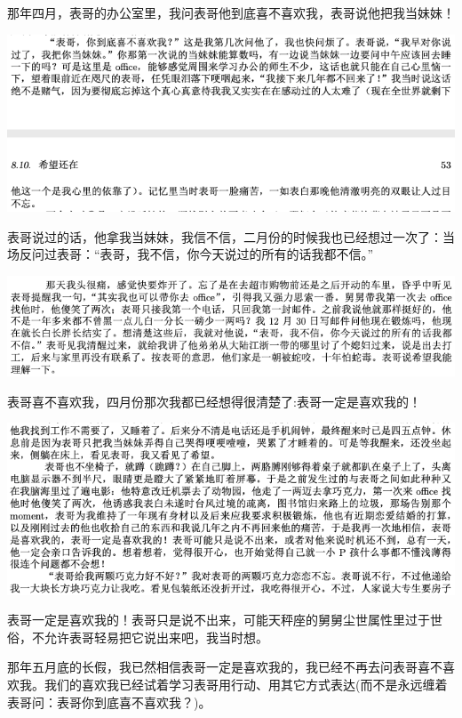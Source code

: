 \documentclass[9pt, b5paper]{article}
\begin{document}
那年四月，表哥的办公室里，我问表哥他到底喜不喜欢我，表哥说他把我当妹妹！

\begin{center}
\includegraphics[width=.9\linewidth]{./pic/p1p52-3.png}
\end{center}

表哥说过的话，他拿我当妹妹，我信不信，二月份的时候我也已经想过一次了：当场反问过表哥：“表哥，我不信，你今天说过的所有的话我都不信。”

\begin{center}
\includegraphics[width=.9\linewidth]{./pic/p1p50-4.png}
\end{center}

表哥喜不喜欢我，四月份那次我都已经想得很清楚了:表哥一定是喜欢我的！

\begin{center}
\includegraphics[width=.9\linewidth]{./pic/p1p53.png}
\end{center}

表哥一定是喜欢我的！表哥只是说不出来，可能天秤座的舅舅尘世属性里过于世俗，不允许表哥轻易把它说出来吧，我当时想。

那年五月底的长假，我已然相信表哥一定是喜欢我的，我已经不再去问表哥喜不喜欢我。我们的喜欢我已经试着学习表哥用行动、用其它方式表达(而不是永远缠着表哥问：表哥你到底喜不喜欢我？)。
\end{document}
